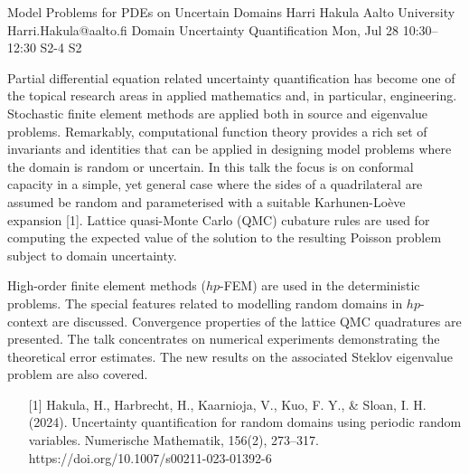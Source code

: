 \begin{talk}
  {Model Problems for PDEs on Uncertain Domains}%
  {Harri Hakula}%
  {Aalto University}%
  {Harri.Hakula@aalto.fi}%
  {Domain Uncertainty Quantification}%
  {}%
  {Mon, Jul 28 10:30–12:30}%
  {S2-4}%
  {S2}%
				
			
Partial differential equation related uncertainty quantification has become one of the
topical research areas in applied mathematics and, in particular, engineering.
Stochastic finite element methods are applied both in source and eigenvalue problems.
Remarkably, computational function theory provides a rich set of invariants 
and identities that
can be applied in designing model problems where the domain is random or uncertain. 
In this talk the focus is on conformal capacity in a simple, 
yet general case where the sides of a quadrilateral are assumed be random 
and parameterised with a suitable Karhunen-Loève expansion [1].
Lattice quasi-Monte Carlo (QMC) cubature rules are used for computing the expected value of the solution to the resulting Poisson problem subject to domain uncertainty. 

High-order finite element methods ($hp$-FEM) are used in the deterministic problems.
The special features related to modelling random domains in $hp$-context are discussed.
Convergence properties of the lattice QMC quadratures are presented. The talk
concentrates on numerical experiments demonstrating the theoretical error estimates.
The new results on the associated Steklov eigenvalue problem are also covered.


\medskip

\begin{enumerate}
	\item[{[1]}] Hakula, H., Harbrecht, H., Kaarnioja, V., Kuo, F. Y., \& Sloan, I. H. (2024). Uncertainty quantification for random domains using periodic random variables. Numerische Mathematik, 156(2), 273–317. https://doi.org/10.1007/s00211-023-01392-6
\end{enumerate}

\end{talk}

